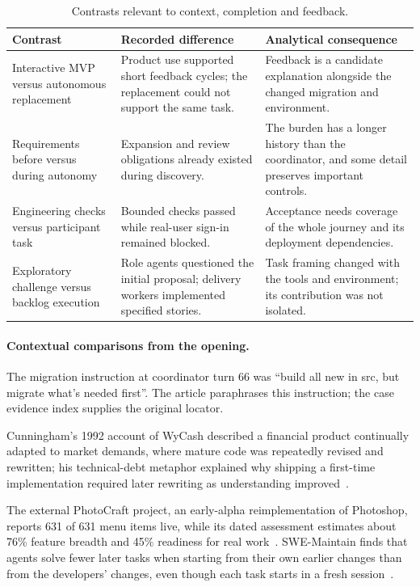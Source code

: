 \begin{table}[!htbp]
\centering\footnotesize
\caption{Contrasts relevant to context, completion and feedback.}\label{tab:contrasts}

\begin{tabularx}{\textwidth}{@{}L{3.1cm}YY@{}}
\toprule
Contrast & Recorded difference & Analytical consequence \\
\midrule
Interactive MVP versus autonomous replacement & Product use supported short
feedback cycles; the replacement could not support the same task. & Feedback
is a candidate explanation alongside the changed migration and environment. \\
Requirements before versus during autonomy & Expansion and review obligations
already existed during discovery. & The burden has a longer history than the
coordinator, and some detail preserves important controls. \\
Engineering checks versus participant task & Bounded checks passed while
real-user sign-in remained blocked. & Acceptance needs coverage of the whole
journey and its deployment dependencies. \\
Exploratory challenge versus backlog execution & Role agents questioned the
initial proposal; delivery workers implemented specified stories. & Task
framing changed with the tools and environment; its contribution was not isolated. \\
\bottomrule
\end{tabularx}
\end{table}


\paragraph{Contextual comparisons from the opening.}

The migration instruction at coordinator turn 66 was ``build all new in
src, but migrate what's needed first''. The article paraphrases this
instruction; the case evidence index supplies the original locator.

Cunningham's 1992 account of WyCash described a financial product
continually adapted to market demands, where mature code was repeatedly
revised and rewritten; his technical-debt metaphor explained why shipping a
first-time implementation required later rewriting as understanding
improved~\cite{cunningham1992wycash}.

The external PhotoCraft project, an early-alpha reimplementation of
Photoshop, reports 631 of 631 menu items live, while its dated
assessment estimates about 76\% feature breadth and 45\%
readiness for real work~\cite{photocraft2026}. SWE-Maintain finds that agents solve
fewer later tasks when starting from their own earlier changes than from
the developers' changes, even though each task starts in a fresh
session~\cite{pan2026swemaintain}.

